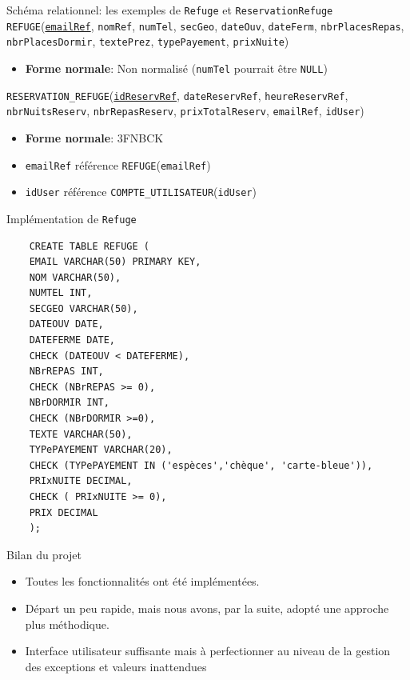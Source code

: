\documentclass{beamer}
\newcommand\att[1]{\textnhtt{#1}}
\begin{document}
\begin{frame}{Schéma relationnel: les exemples de \att{Refuge} et \att{ReservationRefuge}}
\att{REFUGE}(\att{\underline{emailRef}}, \att{nomRef}, \att{numTel}, \att{secGeo}, \att{dateOuv}, \att{dateFerm}, \att{nbrPlacesRepas}, \att{nbrPlacesDormir}, \att{textePrez}, \att{typePayement}, \att{prixNuite})
\begin{itemize}
\item \textbf{Forme normale}: Non normalisé (\att{numTel} pourrait être \att{NULL})
\end{itemize}
\newline
\att{RESERVATION\_REFUGE}(\att{\underline{idReservRef}}, \att{dateReservRef}, \att{heureReservRef}, \att{nbrNuitsReserv}, \att{nbrRepasReserv}, \att{prixTotalReserv}, \att{emailRef}, \att{idUser})
\begin{itemize}
\item \textbf{Forme normale}: 3FNBCK
\item \att{emailRef} référence \att{REFUGE}(\att{emailRef})
\item \att{idUser} référence \att{COMPTE\_UTILISATEUR}(\att{idUser})
\end{itemize}
\end{frame}

\begin{frame}[fragile]{Implémentation de \att{Refuge}}
  \begin{verbatim}
    CREATE TABLE REFUGE (
    EMAIL VARCHAR(50) PRIMARY KEY,
    NOM VARCHAR(50),
    NUMTEL INT,
    SECGEO VARCHAR(50),
    DATEOUV DATE,
    DATEFERME DATE,
    CHECK (DATEOUV < DATEFERME),
    NBrREPAS INT,
    CHECK (NBrREPAS >= 0),
    NBrDORMIR INT,
    CHECK (NBrDORMIR >=0),
    TEXTE VARCHAR(50),
    TYPePAYEMENT VARCHAR(20),
    CHECK (TYPePAYEMENT IN ('espèces','chèque', 'carte-bleue')),
    PRIxNUITE DECIMAL,
    CHECK ( PRIxNUITE >= 0),
    PRIX DECIMAL
    );
  \end{verbatim}
\end{frame}

\begin{frame}{Bilan du projet}
  \begin{itemize}
  \item Toutes les fonctionnalités ont été implémentées.
  \item Départ un peu rapide, mais nous avons, par la suite, adopté une approche plus méthodique.
  \item Interface utilisateur suffisante mais à perfectionner au niveau de la gestion des exceptions et valeurs inattendues
  \end{itemize}
\end{frame}
\end{document}
